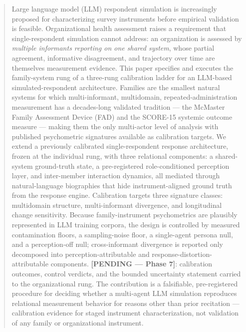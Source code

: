\documentclass[12pt, letterpaper]{article}
\newcommand{\pending}[1]{\textcolor{blue!55!black}{\textbf{[PENDING --- #1]}}}
\begin{document}
\begin{abstract}
\noindent Large language model (LLM) respondent simulation is increasingly proposed for characterizing survey instruments before empirical validation is feasible. Organizational health assessment raises a requirement that single-respondent simulation cannot address: an organization is assessed by \emph{multiple informants reporting on one shared system}, whose partial agreement, informative disagreement, and trajectory over time are themselves measurement evidence. This paper specifies and executes the family-system rung of a three-rung calibration ladder for an LLM-based simulated-respondent architecture. Families are the smallest natural systems for which multi-informant, multidomain, repeated-administration measurement has a decades-long validated tradition --- the McMaster Family Assessment Device (FAD) and the SCORE-15 systemic outcome measure --- making them the only multi-actor level of analysis with published psychometric signatures available as calibration targets. We extend a previously calibrated single-respondent response architecture, frozen at the individual rung, with three relational components: a shared-system ground-truth state, a pre-registered role-conditioned perception layer, and inter-member interaction dynamics, all mediated through natural-language biographies that hide instrument-aligned ground truth from the response engine. Calibration targets three signature classes: multidomain structure, multi-informant divergence, and longitudinal change sensitivity. Because family-instrument psychometrics are plausibly represented in LLM training corpora, the design is controlled by measured contamination floors, a sampling-noise floor, a single-agent persona null, and a perception-off null; cross-informant divergence is reported only decomposed into perception-attributable and response-distortion-attributable components. \pending{Phase 7}: calibration outcomes, control verdicts, and the bounded uncertainty statement carried to the organizational rung. The contribution is a falsifiable, pre-registered procedure for deciding whether a multi-agent LLM simulation reproduces relational measurement behavior for reasons other than prior recitation --- calibration evidence for staged instrument characterization, not validation of any family or organizational instrument.
\end{abstract}

\newpage
\tableofcontents
\newpage

\end{document}
